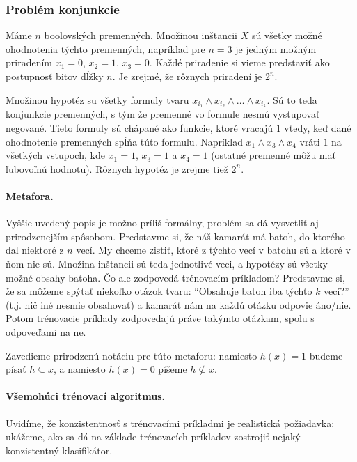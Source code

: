 \subsubsection{Problém konjunkcie}

Máme $n$ boolovských premenných. Množinou inštancii $X$ sú všetky
možné ohodnotenia týchto premenných, napríklad pre $n = 3$ je jedným
možným priradením $x_1 = 0$, $x_2 = 1$, $x_3 = 0$. Každé priradenie
si vieme predstaviť ako postupnosť bitov dĺžky $n$. Je zrejmé, že
rôznych priradení je $2^n$.

Množinou hypotéz su všetky formuly tvaru $x_{i_1} \land x_{i_2} \land \ldots \land x_{i_k}$.
Sú to teda konjunkcie premenných, s tým že premenné vo formule nesmú
vystupovať negované. Tieto formuly sú chápané ako funkcie, ktoré
vracajú $1$ vtedy, keď dané ohodnotenie premenných spĺňa túto formulu.
Napríklad $x_1 \land x_3 \land x_4$ vráti $1$ na všetkých vstupoch,
kde $x_1 = 1$, $x_3 = 1$ a $x_4 = 1$ (ostatné premenné môžu mať
ľubovoľnú hodnotu). Rôznych hypotéz je zrejme tiež $2^n$.

\paragraph{Metafora.} Vyššie uvedený popis je možno príliš formálny, 
problém sa dá vysvetliť aj prirodzenejším spôsobom. Predstavme
si, že náš kamarát má batoh, do ktorého dal niektoré z $n$ vecí.
My chceme zistiť, ktoré z týchto vecí v batohu sú a ktoré v ňom
nie sú. Množina inštancii sú teda jednotlivé veci, a hypotézy sú
všetky možné obsahy batoha. Čo ale zodpovedá trénovacím príkladom?
Predstavme si, že sa môžeme spýtať niekoľko otázok tvaru: ``Obsahuje
batoh iba týchto $k$ vecí?'' (t.j. nič iné nesmie obsahovať) a kamarát
nám na každú otázku odpovie áno/nie. Potom trénovacie príklady
zodpovedajú práve takýmto otázkam, spolu s odpoveďami na ne.

Zavedieme prirodzenú notáciu pre túto metaforu: namiesto $h(x) = 1$
budeme písať $h \subseteq x$, a namiesto $h(x) = 0$ píšeme $h \not\subseteq x$.

\paragraph{Všemohúci trénovací algoritmus.} Uvidíme, že konzistentnosť
s trénovacími príkladmi je realistická požiadavka: ukážeme, ako sa
dá na základe trénovacích príkladov zostrojiť nejaký konzistentný
klasifikátor.

